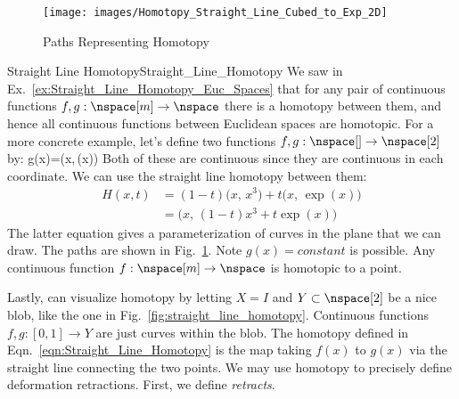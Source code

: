 \documentclass{book}                                                           %
\begin{document}
                \begin{figure}
                    \centering
                    \captionsetup{type=figure}
                    \texttt{[image: images/Homotopy\_Straight\_Line\_Cubed\_to\_Exp\_2D]}
                    \caption{Paths Representing Homotopy}
                    \label{fig:Paths_Representing_Homotopy}
                \end{figure}
                \begin{lexample}{Straight Line Homotopy}{Straight_Line_Homotopy}
                    We saw in Ex.~\ref{ex:Straight_Line_Homotopy_Euc_Spaces}
                    that for any pair of continuous functions
                    $f,g:\nspace[m]\rightarrow\nspace$ there is a homotopy
                    between them, and hence all continuous functions between
                    Euclidean spaces are homotopic. For a more concrete example,
                    let's define two functions
                    $f,g:\nspace[]\rightarrow\nspace[2]$ by:
                                {g(x)=\big(x,\,\exp(x)\big)}
                    Both of these are continuous since they are continuous in
                    each coordinate. We can use the straight line homotopy
                    between them:
                    \begin{subequations}
                        \begin{align}
                            H(x,t)
                            &=(1-t)\big(x,\,x^{3}\big)+t\big(x,\,\exp(x)\big)\\
                            &=\big(x,\,(1-t)x^{3}+t\exp(x)\big)
                        \end{align}
                    \end{subequations}
                    The latter equation gives a parameterization of curves in
                    the plane that we can draw. The paths are shown in
                    Fig.~\ref{fig:Paths_Representing_Homotopy}. Note
                    $g(x)=constant$ is possible. Any continuous function
                    $f:\nspace[m]\rightarrow\nspace$ is homotopic to a point.
                \end{lexample}
                \begin{minipage}{0.50\textwidth}
                    Lastly, can visualize homotopy by letting $X=I$ and
                    $Y\subset\nspace[2]$ be a nice blob, like the one in
                    Fig.~\ref{fig:straight_line_homotopy}. Continuous functions
                    $f,g:[0,1]\rightarrow{Y}$ are just curves within the
                    blob. The homotopy defined in
                    Eqn.~\ref{eqn:Straight_Line_Homotopy} is the map taking
                    $f(x)$ to $g(x)$ via the straight line connecting the two
                    points. We may use homotopy to precisely define deformation
                    retractions. First, we define \textit{retracts}.
                \end{minipage}
\end{document}
